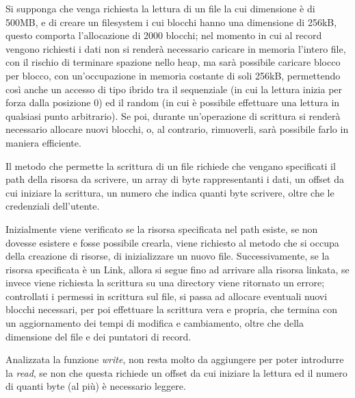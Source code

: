Si supponga che venga richiesta la lettura di un file la cui dimensione è di 500MB, e di creare un filesystem i cui blocchi hanno una dimensione di 256kB, questo comporta l'allocazione di 2000 blocchi; nel momento in cui al record vengono richiesti i dati non si renderà necessario caricare in memoria l'intero file, con il rischio di terminare spazione nello heap, ma sarà possibile caricare blocco per blocco, con un'occupazione in memoria costante di soli 256kB, permettendo così anche un accesso di tipo ibrido tra il sequenziale (in cui la lettura inizia per forza dalla posizione 0) ed il random (in cui è possibile effettuare una lettura in qualsiasi punto arbitrario). Se poi, durante un'operazione di scrittura si renderà necessario allocare nuovi blocchi, o, al contrario, rimuoverli, sarà possibile farlo in maniera efficiente.

Il metodo che permette la scrittura di un file richiede che vengano specificati il path della risorsa da scrivere, un array di byte rappresentanti i dati, un offset da cui iniziare la scrittura, un numero che indica quanti byte scrivere, oltre che le credenziali dell'utente.

Inizialmente viene verificato se la risorsa specificata nel path esiste, se non dovesse esistere e fosse possibile crearla, viene richiesto al metodo che si occupa della creazione di risorse, di inizializzare un nuovo file. Successivamente, se la risorsa specificata è un Link, allora si segue fino ad arrivare alla risorsa linkata, se invece viene richiesta la scrittura su una directory viene ritornato un errore; controllati i permessi in scrittura sul file, si passa ad allocare eventuali nuovi blocchi necessari, per poi effettuare la scrittura vera e propria, che termina con un aggiornamento dei tempi di modifica e cambiamento, oltre che della dimensione del file e dei puntatori di record.

Analizzata la funzione \emph{write}, non resta molto da aggiungere per poter introdurre la \emph{read}, se non che questa richiede un offset da cui iniziare la lettura ed il numero di quanti byte (al più) è necessario leggere.

